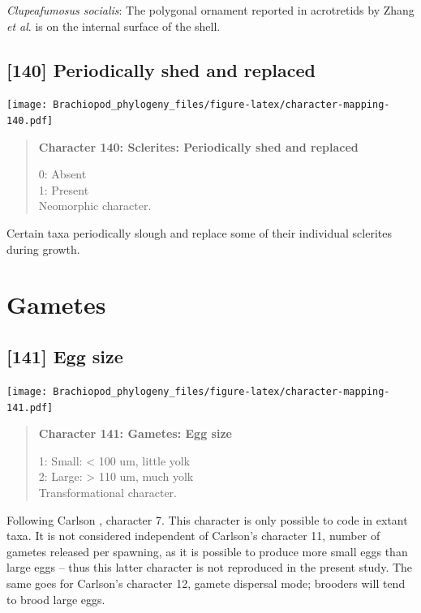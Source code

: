 \documentclass[openany]{book}
\begin{document}
\hypertarget{Clupeafumosus_socialis-coding-139}{}
\emph{Clupeafumosus socialis}: The polygonal ornament reported in
acrotretids by Zhang \emph{et al}. \citeyearpar{Zhang2016Epithelialcell}
is on the internal surface of the shell.

\subsection*{{[}140{]} Periodically shed and
replaced}\label{periodically-shed-and-replaced}

\texttt{[image: Brachiopod\_phylogeny\_files/figure-latex/character-mapping-140.pdf]}

\begin{quote}
\textbf{Character 140: Sclerites: Periodically shed and replaced}

0: Absent\\
1: Present\\
Neomorphic character.
\end{quote}

Certain taxa periodically slough and replace some of their individual
sclerites during growth.

\section{Gametes}\label{gametes}

\subsection*{{[}141{]} Egg size}\label{egg-size}

\texttt{[image: Brachiopod\_phylogeny\_files/figure-latex/character-mapping-141.pdf]}

\begin{quote}
\textbf{Character 141: Gametes: Egg size}

1: Small: \textless{} 100 um, little yolk\\
2: Large: \textgreater{} 110 um, much yolk\\
Transformational character.
\end{quote}

Following Carlson \citeyearpar{Carlson1995Phylogeneticrelationships},
character 7. This character is only possible to code in extant taxa. It
is not considered independent of Carlson's character 11, number of
gametes released per spawning, as it is possible to produce more small
eggs than large eggs -- thus this latter character is not reproduced in
the present study. The same goes for Carlson's character 12, gamete
dispersal mode; brooders will tend to brood large eggs.
\end{document}
